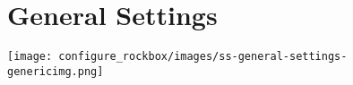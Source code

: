\section{\label{ref:GeneralSettings}General Settings}
  \begin{center}
    \texttt{[image: configure\_rockbox/images/ss-general-settings-\\genericimg.png]}
  \end{center}

  